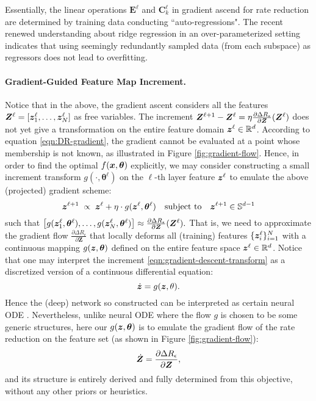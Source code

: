 \documentclass[../../book-main.tex]{subfiles}
\begin{document}
\begin{remark}
Essentially, the linear operations $\bm E^\ell$ and $\bm C_k^\ell$ in gradient ascend for rate reduction are determined by training data conducting ``auto-regressions". The recent renewed understanding about ridge regression in an over-parameterized setting \cite{yang2020rethinking,Wu2020OnTO} indicates that using seemingly redundantly sampled data (from each subspace) as regressors does not lead to overfitting.
\end{remark}

\paragraph{Gradient-Guided Feature Map Increment.} Notice that in the above, the gradient ascent considers all the features $\bm{Z}^{\ell} = [\bm{z}^{\ell}_{1}, \dots, \bm{z}^{\ell}_{N}]$ as free variables. The increment $\bm{Z}^{\ell+1} - \bm{Z}^{\ell} = \eta \frac{\partial \Delta R_{\epsilon}}{\partial \bm Z}(\bm{Z}^\ell)$ does not yet give a transformation on the entire feature domain $\bm{z}^\ell \in \mathbb{R}^d$. According to equation \eqref{eqn:DR-gradient}, the gradient cannot be evaluated at a point whose membership is not known, as illustrated in Figure \ref{fig:gradient-flow}. Hence, in order to find the optimal $f(\bm{x},\bm  \theta)$ explicitly, we may consider constructing a small increment transform $g(\cdot, \bm{\theta}^{\ell})$ on the $\ell$-th layer feature $\bm{z}^\ell$ to emulate the above (projected) gradient scheme:
\begin{equation}
\bm{z}^{\ell + 1}   \; \propto \; \bm{z}^{\ell} + \eta\cdot  g(\bm{z}^{\ell}, \bm{\theta}^{\ell}) \quad \mbox{subject to} \quad \bm{z}^{\ell +1} \in \mathbb{S}^{d-1}
\label{eqn:gradient-descent-transform}
\end{equation}
such that $\big[g(\bm{z}_1^{\ell}, \bm \theta^{\ell}), \ldots, g(\bm{z}_N^{\ell}, \bm \theta^{\ell}) \big] \approx \frac{\partial \Delta R_{\epsilon}}{\partial \bm Z}(\bm{Z}^\ell).$ That is, we need to approximate the gradient flow $\frac{\partial \Delta R_{\epsilon}}{\partial \bm Z}$ that locally deforms all (training) features $\{\bm{z}_i^\ell\}_{i=1}^N$ with a continuous mapping $g(\bm{z},\bm \theta)$ defined on the entire feature space $\bm{z}^\ell \in \mathbb{R}^d$.  
Notice that one may interpret the increment \eqref{eqn:gradient-descent-transform} as a discretized version of a continuous  differential equation:
\begin{equation}
\dot{\bm{z}} = g(\bm{z}, \theta).
\end{equation}
Hence the (deep) network so constructed can be interpreted as certain neural ODE \cite{chen2018neural}. Nevertheless, unlike neural ODE where the flow $g$ is chosen to be some generic structures, here our $g(\bm{z}, \bm\theta)$ is to emulate the gradient flow of the rate reduction on the feature set (as shown in Figure \ref{fig:gradient-flow}): 
\begin{equation*}
    \dot{\bm{Z}} = \frac{\partial \Delta R_{\epsilon}}{\partial \bm Z},
\end{equation*} 
and its structure is entirely derived and fully determined from this objective, without any other priors or heuristics.  
\end{document}

